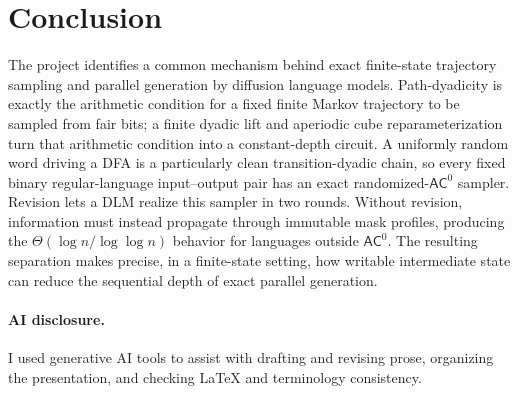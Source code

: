 \documentclass[10pt]{article}
\theoremstyle{definition}
\newcommand{\AC}{\mathsf{AC}}
\begin{document}
\section{Conclusion}

The project identifies a common mechanism behind exact finite-state trajectory
sampling and parallel generation by diffusion language models.  Path-dyadicity is exactly the
arithmetic condition for a fixed finite Markov trajectory to be sampled from
fair bits; a finite dyadic lift and aperiodic cube reparameterization turn that
arithmetic condition into a constant-depth circuit.  A uniformly random word
driving a DFA is a particularly clean transition-dyadic chain, so every fixed
binary regular-language input--output pair has an exact randomized-$\AC^0$
sampler.  Revision lets a DLM realize this sampler in two rounds.  Without
revision, information must instead propagate through immutable mask profiles,
producing the $\Theta(\log n/\log\log n)$ behavior for languages outside
$\AC^0$.  The resulting separation makes precise, in a finite-state setting,
how writable intermediate state can reduce the sequential depth of exact
parallel generation.

\paragraph{AI disclosure.}
I used generative AI tools to assist with drafting and revising prose,
organizing the presentation, and checking LaTeX and terminology consistency.



\end{document}
